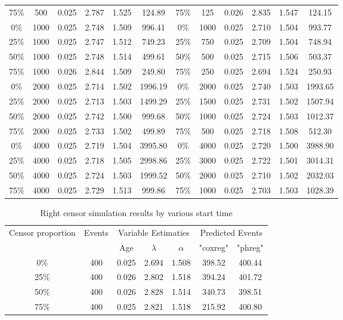 \documentclass[12pt,letterpaper]{article}
\begin{document}
\begin{table}[htbp]
\begin{tabular}{cccccc||cccccc}
				75\%  & 500   & 0.025 & 2.787 & 1.525 & 124.89 & 75\%  & 125 & 0.026 & 2.835 & 1.547 & 124.15 \\
				0\%   & 1000  & 0.025 & 2.748 & 1.509 & 996.41 & 0\%   & 1000 & 0.025 & 2.710 & 1.504 & 993.77 \\
				25\%  & 1000   & 0.025 & 2.747 & 1.512 & 749.23 & 25\%  & 750 & 0.025 & 2.709 & 1.504 & 748.94 \\
				50\%  & 1000   & 0.025 & 2.748 & 1.514 & 499.61 & 50\%  & 500 & 0.025 & 2.715 & 1.506 & 503.37 \\
				75\%  & 1000   & 0.026 & 2.844 & 1.509 & 249.80 & 75\%  & 250 & 0.025 & 2.694 & 1.524 & 250.93 \\
				0\%   & 2000  & 0.025 & 2.714 & 1.502 & 1996.19 & 0\%   & 2000 & 0.025 & 2.740 & 1.503 & 1993.65 \\
				25\%  & 2000  & 0.025 & 2.713 & 1.503 & 1499.29 & 25\%  & 1500 & 0.025 & 2.731 & 1.502 & 1507.94 \\
				50\%  & 2000  & 0.025 & 2.742 & 1.500 & 999.68 & 50\%  & 1000  & 0.025 & 2.724 & 1.503 & 1012.37 \\
				75\%  & 2000   & 0.025 & 2.733 & 1.502 & 499.89 & 75\%  & 500 & 0.025 & 2.718 & 1.508 & 512.30 \\
				0\%   & 4000  & 0.025 & 2.719 & 1.504 & 3995.80 & 0\%   & 4000 & 0.025 & 2.720 & 1.500 & 3988.90 \\
				25\%  & 4000  & 0.025 & 2.718 & 1.505 & 2998.86 & 25\%  & 3000 & 0.025 & 2.722 & 1.501 & 3014.31 \\
				50\%  & 4000  & 0.025 & 2.724 & 1.503 & 1999.52 & 50\%  & 2000 & 0.025 & 2.710 & 1.502 & 2032.03 \\
				75\%  & 4000  & 0.025 & 2.729 & 1.513 & 999.86 & 75\%  & 1000 & 0.025 & 2.703 & 1.503 & 1028.39 \\
				\bottomrule
	\end{tabular}%
	\label{tab:rightcensor}%
\end{table}%

\begin{table}[htbp]
	\renewcommand{\arraystretch}{1.5}
	\centering
	\caption{Right censor simulation results by various start time}
	\begin{tabular}{ccccccc}
		\toprule
    	\multicolumn{1}{c}{\multirow{2}{1.5cm}{Censor proportion}}  & \multirow{2}[4]{*}{Events} & \multicolumn{3}{c}{Variable Estimaties} & \multicolumn{2}{c}{Predicted Events} \\ \cline{3-7}
		     &       & Age   & $\lambda$ & $\alpha$ & "coxreg" & "phreg" \\
		\midrule
		0\%   & 400   & 0.025 & 2.694 & 1.508 & 398.52 & 400.44 \\
		25\%  & 400   & 0.026 & 2.802 & 1.518 & 394.24 & 401.72 \\
		50\%  & 400   & 0.026 & 2.828 & 1.514 & 340.73 & 398.51 \\
		75\%  & 400   & 0.025 & 2.821 & 1.518 & 215.92 & 400.80 \\
		\bottomrule
	\end{tabular}%
	\label{tab:right2}%
\end{table}%
\end{document}

